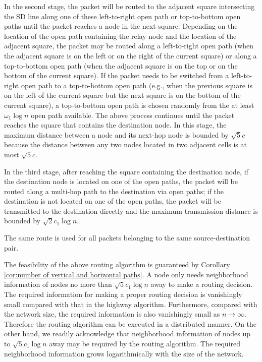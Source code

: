 \documentclass[english]{IEEEtran}
\theoremstyle{plain}
\theoremstyle{plain}
\theoremstyle{plain}
\theoremstyle{remark}
\begin{document}
In the second stage, the packet will be routed to the adjacent square
intersecting the SD line along one of these left-to-right open path
or top-to-bottom open paths until the packet reaches a node in the
next square. Depending on the location of the open path containing
the relay node and the location of the adjacent square, the packet
may be routed along a left-to-right open path (when the adjacent square
is on the left or on the right of the current square) or along a top-to-bottom
open path (when the adjacent square is on the top or on the bottom
of the current square). If the packet needs to be switched from a
left-to-right open path to a top-to-bottom open path (e.g., when the
previous square is on the left of the current square but the next
square is on the bottom of the current square), a top-to-bottom open
path is chosen randomly from the at least $\omega_{1}\log n$ open
path available. The above process continues until the packet reaches
the square that contains the destination node. In this stage, the
maximum distance between a node and its next-hop node is bounded by
$\sqrt{5}c$ because the distance between any two nodes located in
two adjacent cells is at most $\sqrt{5}c$. 

In the third stage, after reaching the square containing the destination
node, if the destination node is located on one of the open paths,
the packet will be routed along a multi-hop path to the destination
via open paths; if the destination is not located on one of the open
paths, the packet will be transmitted to the destination directly
and the maximum transmission distance is bounded by $\sqrt{2}c_{1}\log n$. 

The same route is used for all packets belonging to the same source-destination
pair.

The feasibility of the above routing algorithm is guaranteed by Corollary
\ref{cor:number of vertical and horizontal paths}. A node only needs
neighborhood information of nodes no more than $\sqrt{5}c_{1}\log n$
away to make a routing decision. The required information for making
a proper routing decision is vanishingly small compared with that
in the highway algorithm. Furthermore, compared with the network size,
the required information is also vanishingly small as $n\rightarrow\infty$.
Therefore the routing algorithm can be executed in a distributed manner.\textbf{
}On the other hand, we readily acknowledge that neighborhood information
of nodes up to $\sqrt{5}c_{1}\log n$ away\textbf{ }may be required
by the routing algorithm.\textbf{ }The required neighborhood information
grows logarithmically with the size of the network.
\end{document}

